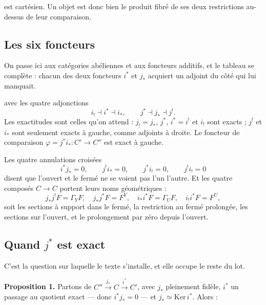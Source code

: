 \documentclass[11pt,a4paper]{article}
\begin{document}
est cartésien. Un objet est donc bien le produit fibré de ses deux
restrictions au-dessus de leur comparaison.

\subsection*{Les six foncteurs}

On passe ici aux catégories abéliennes et aux foncteurs additifs, et le tableau
se complète : chacun des deux foncteurs $i^{*}$ et $j_{*}$ acquiert un adjoint
du côté qui lui manquait.


avec les quatre adjonctions
\[
  i_{!} \dashv i^{*} \dashv i_{*} , \qquad j^{*} \dashv j_{*} \dashv j^{!} .
\]
Les exactitudes sont celles qu'on attend : $j_{!} = j_{*}$, $j^{*}$,
$i^{*} = i^{!}$ et $i_{!}$ sont exacts ; $j^{!}$ et $i_{*}$ sont seulement
exacts à gauche, comme adjoints à droite. Le foncteur de comparaison
$\varphi = j^{*}i_{*} : C' \to C''$ est exact à gauche.

Les quatre annulations croisées
\[
  i^{*} j_{*} = 0 , \qquad j^{!} i_{*} = 0 , \qquad
  j^{*} i_{!} = 0 , \qquad j^{!} i_{!} = 0
\]
disent que l'ouvert et le fermé ne se voient pas l'un l'autre. Et les quatre
composés $C \to C$ portent leurs noms géométriques :
\[
  j_{*}j^{!}F = \Gamma_{Y}F , \quad j_{*}j^{*}F = F^{Y} , \quad
  i_{*}i^{*}F = \Gamma_{U}F , \quad i_{!}i^{*}F = F^{U} ,
\]
soit les sections à support dans le fermé, la restriction au fermé prolongée,
les sections sur l'ouvert, et le prolongement par zéro depuis l'ouvert.

\subsection*{Quand $j^{*}$ est exact}

C'est la question sur laquelle le texte s'installe, et elle occupe le reste du
lot.

\textbf{Proposition 1.} Partons de $C'' \xrightarrow{j_{*}} C
\xrightarrow{i^{*}} C'$, avec $j_{*}$ pleinement fidèle, $i^{*}$ un passage au
quotient exact — donc $i^{*}j_{*} = 0$ — et $j_{*} \simeq \mathrm{Ker}\,i^{*}$.
Alors :
\end{document}
